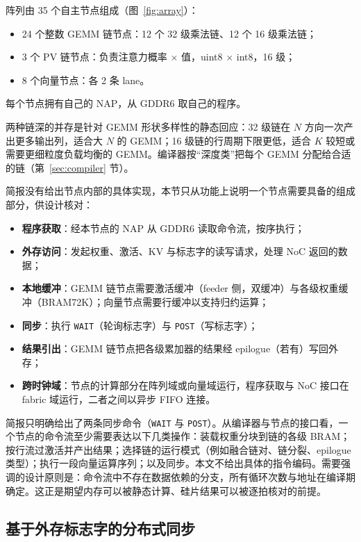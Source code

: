 \documentclass[a4paper,10.5pt]{ctexart}
\begin{document}
阵列由 35 个自主节点组成（图~\ref{fig:array}）：
\begin{itemize}
  \item 24 个整数 GEMM 链节点：12 个 32 级乘法链、12 个 16 级乘法链；
  \item 3 个 PV 链节点：负责注意力概率 $\times$ 值，uint8 $\times$ int8，16 级；
  \item 8 个向量节点：各 2 条 lane。
\end{itemize}
每个节点拥有自己的 NAP，从 GDDR6 取自己的程序。

两种链深的并存是针对 GEMM 形状多样性的静态回应：32 级链在 $N$ 方向一次产出更多输出列，适合大 $N$ 的 GEMM；16 级链的行周期下限更低，适合 $K$ 较短或需要更细粒度负载均衡的 GEMM。编译器按“深度类”把每个 GEMM 分配给合适的链（第~\ref{sec:compiler} 节）。

简报没有给出节点内部的具体实现，本节只从功能上说明一个节点需要具备的组成部分，供设计核对：
\begin{itemize}
  \item \textbf{程序获取}：经本节点的 NAP 从 GDDR6 读取命令流，按序执行；
  \item \textbf{外存访问}：发起权重、激活、KV 与标志字的读写请求，处理 NoC 返回的数据；
  \item \textbf{本地缓冲}：GEMM 链节点需要激活缓冲（feeder 侧，双缓冲）与各级权重缓冲（BRAM72K）；向量节点需要行缓冲以支持归约运算；
  \item \textbf{同步}：执行 \texttt{WAIT}（轮询标志字）与 \texttt{POST}（写标志字）；
  \item \textbf{结果引出}：GEMM 链节点把各级累加器的结果经 epilogue（若有）写回外存；
  \item \textbf{跨时钟域}：节点的计算部分在阵列域或向量域运行，程序获取与 NoC 接口在 fabric 域运行，二者之间以异步 FIFO 连接。
\end{itemize}

简报只明确给出了两条同步命令（\texttt{WAIT} 与 \texttt{POST}）。从编译器与节点的接口看，一个节点的命令流至少需要表达以下几类操作：装载权重分块到链的各级 BRAM；按行流过激活并产出结果；选择链的运行模式（例如融合链对、链分裂、epilogue 类型）；执行一段向量运算序列；以及同步。本文不给出具体的指令编码。需要强调的设计原则是：命令流中不存在数据依赖的分支，所有循环次数与地址在编译期确定。这正是期望内存可以被静态计算、硅片结果可以被逐拍核对的前提。

\subsection{基于外存标志字的分布式同步}\label{sec:sync}
\end{document}

